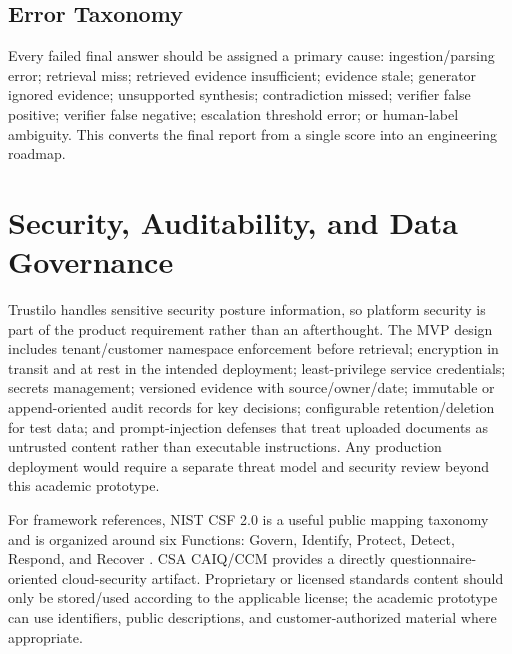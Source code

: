 \documentclass[11pt,journal,onecolumn]{IEEEtran}
\begin{document}
\subsection{Error Taxonomy}
Every failed final answer should be assigned a primary cause: ingestion/parsing error; retrieval miss; retrieved evidence insufficient; evidence stale; generator ignored evidence; unsupported synthesis; contradiction missed; verifier false positive; verifier false negative; escalation threshold error; or human-label ambiguity. This converts the final report from a single score into an engineering roadmap.

\section{Security, Auditability, and Data Governance}
Trustilo handles sensitive security posture information, so platform security is part of the product requirement rather than an afterthought. The MVP design includes tenant/customer namespace enforcement before retrieval; encryption in transit and at rest in the intended deployment; least-privilege service credentials; secrets management; versioned evidence with source/owner/date; immutable or append-oriented audit records for key decisions; configurable retention/deletion for test data; and prompt-injection defenses that treat uploaded documents as untrusted content rather than executable instructions. Any production deployment would require a separate threat model and security review beyond this academic prototype.

For framework references, NIST CSF 2.0 is a useful public mapping taxonomy and is organized around six Functions: Govern, Identify, Protect, Detect, Respond, and Recover \cite{nist2024csf,nist2024news}. CSA CAIQ/CCM provides a directly questionnaire-oriented cloud-security artifact. Proprietary or licensed standards content should only be stored/used according to the applicable license; the academic prototype can use identifiers, public descriptions, and customer-authorized material where appropriate.

\end{document}
